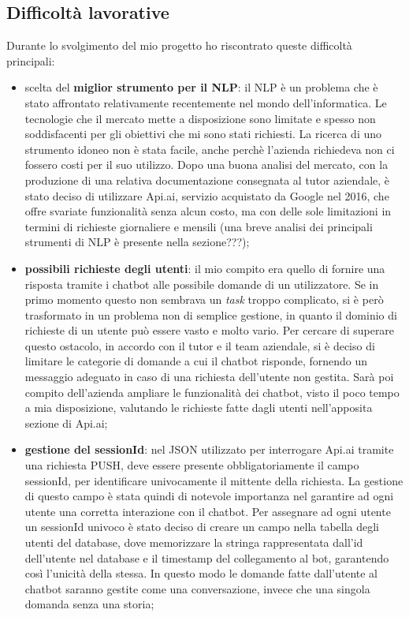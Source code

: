 \subsection{Difficoltà lavorative}
Durante lo svolgimento del mio progetto ho riscontrato queste difficoltà principali:
\begin{itemize}
	\item scelta del \textbf{miglior strumento per il \gls{NLP}}: il \gls{NLP} è un problema che è stato affrontato relativamente recentemente nel mondo dell'informatica. Le tecnologie che il mercato mette a disposizione sono limitate e spesso non soddisfacenti per gli obiettivi che mi sono stati richiesti. La ricerca di uno strumento idoneo non è stata facile, anche perchè l'azienda richiedeva non ci fossero costi per il suo utilizzo. Dopo una buona analisi del mercato, con la produzione di una relativa documentazione consegnata al tutor aziendale, è stato deciso di utilizzare Api.ai, servizio acquistato da Google nel 2016, che offre svariate funzionalità senza alcun costo, ma con delle sole limitazioni in termini di richieste giornaliere e mensili (una breve analisi dei principali strumenti di NLP è presente nella sezione???);
	\item \textbf{possibili richieste degli utenti}: il mio compito era quello di fornire una risposta tramite i \gls{chatbot} alle possibile domande di un utilizzatore. Se in primo momento questo non sembrava un \emph{task} troppo complicato, si è però trasformato in un problema non di semplice gestione, in quanto il dominio di richieste di un utente può essere vasto e molto vario. Per cercare di superare questo ostacolo, in accordo con il tutor e il team aziendale, si è deciso di limitare le categorie di domande a cui il \gls{chatbot} risponde, fornendo un messaggio adeguato in caso di una richiesta dell'utente non gestita. Sarà poi compito dell'azienda ampliare le funzionalità dei \gls{chatbot}, visto il poco tempo a mia disposizione, valutando le richieste fatte dagli utenti nell'apposita sezione di Api.ai;
	\item \textbf{gestione del sessionId}: nel \gls{JSON} utilizzato per interrogare Api.ai tramite una richiesta PUSH, deve essere presente obbligatoriamente il campo sessionId, per identificare univocamente il mittente della richiesta. La gestione di questo campo è stata quindi di notevole importanza nel garantire ad ogni utente una corretta interazione con il \gls{chatbot}. Per assegnare ad ogni utente un sessionId univoco è stato deciso di creare un campo nella tabella degli utenti del database, dove memorizzare la stringa rappresentata dall'id dell'utente nel database e il timestamp del collegamento al bot, garantendo così l'unicità della stessa. In questo modo le domande fatte dall'utente al \gls{chatbot} saranno gestite come una conversazione, invece che una singola domanda senza una storia;
\end{itemize}

